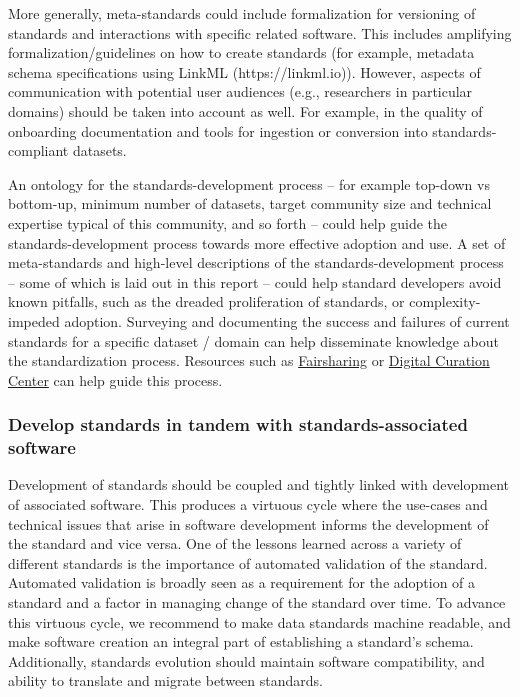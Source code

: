 \documentclass[
  letterpaper,
  DIV=11,
  numbers=noendperiod]{scrartcl}
\begin{document}
More generally, meta-standards could include formalization for
versioning of standards and interactions with specific related software.
This includes amplifying formalization/guidelines on how to create
standards (for example, metadata schema specifications using LinkML
(https://linkml.io)). However, aspects of communication with potential
user audiences (e.g., researchers in particular domains) should be taken
into account as well. For example, in the quality of onboarding
documentation and tools for ingestion or conversion into
standards-compliant datasets.

An ontology for the standards-development process -- for example
top-down vs bottom-up, minimum number of datasets, target community size
and technical expertise typical of this community, and so forth -- could
help guide the standards-development process towards more effective
adoption and use. A set of meta-standards and high-level descriptions of
the standards-development process -- some of which is laid out in this
report -- could help standard developers avoid known pitfalls, such as
the dreaded proliferation of standards, or complexity-impeded adoption.
Surveying and documenting the success and failures of current standards
for a specific dataset / domain can help disseminate knowledge about the
standardization process. Resources such as
\href{https://fairsharing.org/}{Fairsharing} or
\href{https://www.dcc.ac.uk/guidance/standards}{Digital Curation Center}
can help guide this process.

\subsubsection{Develop standards in tandem with standards-associated
software}\label{develop-standards-in-tandem-with-standards-associated-software}

Development of standards should be coupled and tightly linked with
development of associated software. This produces a virtuous cycle where
the use-cases and technical issues that arise in software development
informs the development of the standard and vice versa. One of the
lessons learned across a variety of different standards is the
importance of automated validation of the standard. Automated validation
is broadly seen as a requirement for the adoption of a standard and a
factor in managing change of the standard over time. To advance this
virtuous cycle, we recommend to make data standards machine readable,
and make software creation an integral part of establishing a standard's
schema. Additionally, standards evolution should maintain software
compatibility, and ability to translate and migrate between standards.
\end{document}
